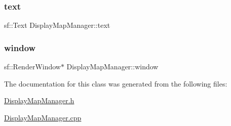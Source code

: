 \subsubsection{\texorpdfstring{text}{text}}
{\footnotesize\ttfamily sf\+::\+Text Display\+Map\+Manager\+::text}

\mbox{\label{class_display_map_manager_a880f01a1287f35cc4852c2e5d58ecd24}} 
\subsubsection{\texorpdfstring{window}{window}}
{\footnotesize\ttfamily sf\+::\+Render\+Window$\ast$ Display\+Map\+Manager\+::window}



The documentation for this class was generated from the following files\+:\begin{DoxyCompactItemize}
\item 
\hyperlink{_display_map_manager_8h}{Display\+Map\+Manager.\+h}\item 
\hyperlink{_display_map_manager_8cpp}{Display\+Map\+Manager.\+cpp}\end{DoxyCompactItemize}
